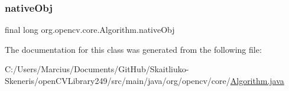 \subsubsection{\texorpdfstring{native\+Obj}{nativeObj}}
{\footnotesize\ttfamily final long org.\+opencv.\+core.\+Algorithm.\+native\+Obj\hspace{0.3cm}{\ttfamily [protected]}}



The documentation for this class was generated from the following file\+:\begin{DoxyCompactItemize}
\item 
C\+:/\+Users/\+Marcius/\+Documents/\+Git\+Hub/\+Skaitliuko-\/\+Skeneris/open\+C\+V\+Library249/src/main/java/org/opencv/core/\mbox{\hyperlink{_algorithm_8java}{Algorithm.\+java}}\end{DoxyCompactItemize}
